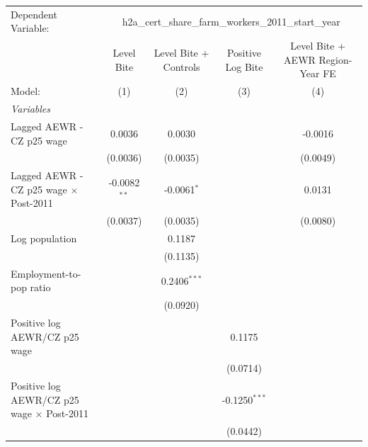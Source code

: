 
\begingroup
\centering
\begin{tabular}{lcccc}
   \tabularnewline \midrule \midrule
   Dependent Variable: & \multicolumn{4}{c}{h2a\_cert\_share\_farm\_workers\_2011\_start\_year}\\
                                                     & Level Bite     & Level Bite + Controls & Positive Log Bite & Level Bite + AEWR Region-Year FE \\   
   Model:                                            & (1)            & (2)                   & (3)               & (4)\\  
   \midrule
   \emph{Variables}\\
   Lagged AEWR - CZ p25 wage                         & 0.0036         & 0.0030                &                   & -0.0016\\   
                                                     & (0.0036)       & (0.0035)              &                   & (0.0049)\\   
   Lagged AEWR - CZ p25 wage $\times$ Post-2011      & -0.0082$^{**}$ & -0.0061$^{*}$         &                   & 0.0131\\   
                                                     & (0.0037)       & (0.0035)              &                   & (0.0080)\\   
   Log population                                    &                & 0.1187                &                   &   \\   
                                                     &                & (0.1135)              &                   &   \\   
   Employment-to-pop ratio                           &                & 0.2406$^{***}$        &                   &   \\   
                                                     &                & (0.0920)              &                   &   \\   
   Positive log AEWR/CZ p25 wage                     &                &                       & 0.1175            &   \\   
                                                     &                &                       & (0.0714)          &   \\   
   Positive log AEWR/CZ p25 wage $\times$ Post-2011  &                &                       & -0.1250$^{***}$   &   \\   
                                                     &                &                       & (0.0442)          &   \\   

\end{tabular}
